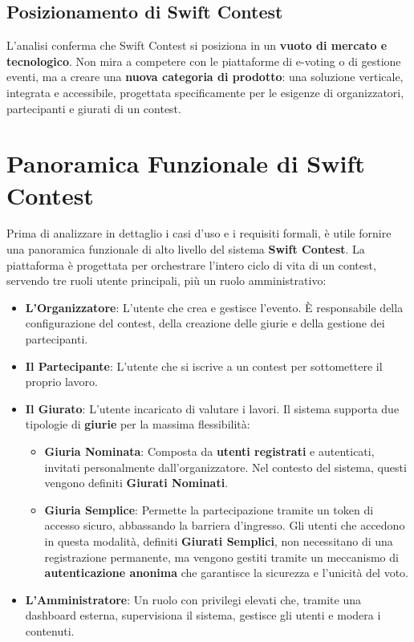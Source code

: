 \subsection{Posizionamento di Swift Contest}\label{subsec:posizionamento-di-swift-contest}
L'analisi conferma che Swift Contest si posiziona in un \textbf{vuoto di mercato e tecnologico}.
Non mira a competere con le piattaforme di e-voting o di gestione eventi, ma a creare una \textbf{nuova categoria di prodotto}: una soluzione verticale, integrata e accessibile, progettata specificamente per le esigenze di organizzatori, partecipanti e giurati di un contest.

\section{Panoramica Funzionale di Swift Contest}\label{sec:panoramica-funzionale}
Prima di analizzare in dettaglio i casi d'uso e i requisiti formali, è utile fornire una panoramica funzionale di alto livello del sistema \textbf{Swift Contest}.
La piattaforma è progettata per orchestrare l'intero ciclo di vita di un contest, servendo tre ruoli utente principali, più un ruolo amministrativo:

\begin{itemize}
    \item \textbf{L'Organizzatore}: L'utente che crea e gestisce l'evento.
    È responsabile della configurazione del contest, della creazione delle giurie e della gestione dei partecipanti.
    \item \textbf{Il Partecipante}: L'utente che si iscrive a un contest per sottomettere il proprio lavoro.
    \item \textbf{Il Giurato}: L'utente incaricato di valutare i lavori.
    Il sistema supporta due tipologie di \textbf{giurie} per la massima flessibilità:
    \begin{itemize}
        \item \textbf{Giuria Nominata}: Composta da \textbf{utenti registrati} e autenticati, invitati personalmente dall'organizzatore.
        Nel contesto del sistema, questi vengono definiti \textbf{Giurati Nominati}.
        \item \textbf{Giuria Semplice}: Permette la partecipazione tramite un token di accesso sicuro, abbassando la barriera d'ingresso.
        Gli utenti che accedono in questa modalità, definiti \textbf{Giurati Semplici}, non necessitano di una registrazione permanente, ma vengono gestiti tramite un meccanismo di \textbf{autenticazione anonima} che garantisce la sicurezza e l'unicità del voto.
    \end{itemize}
    \item \textbf{L'Amministratore}: Un ruolo con privilegi elevati che, tramite una dashboard esterna, supervisiona il sistema, gestisce gli utenti e modera i contenuti.
\end{itemize}

